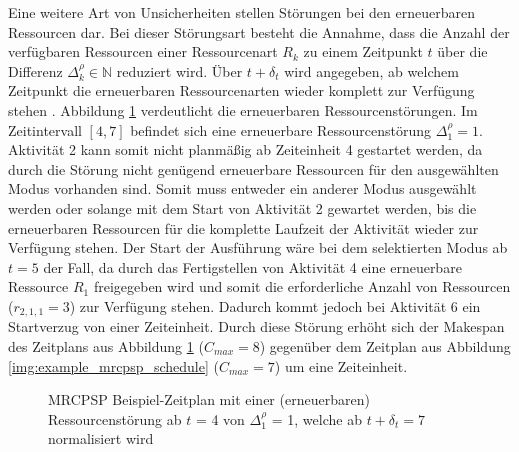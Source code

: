 Eine weitere Art von Unsicherheiten stellen Störungen bei den erneuerbaren Ressourcen dar. Bei dieser Störungsart besteht die Annahme, dass die Anzahl der verfügbaren Ressourcen einer Ressourcenart $R_k$ zu einem Zeitpunkt $t$ über die Differenz $\Delta^\rho_k \in \mathbb{N}$ reduziert wird. Über $t + \delta_t$ wird angegeben, ab welchem Zeitpunkt die erneuerbaren Ressourcenarten wieder komplett zur Verfügung stehen \cite[vgl.][S. 65 f.]{deblaere_reactive_2011}. Abbildung \ref{img:example_mrcpsp_schedule_resourcedisturbance} verdeutlicht die erneuerbaren Ressourcenstörungen. Im Zeitintervall $[4, 7]$ befindet sich eine erneuerbare Ressourcenstörung $\Delta^\rho_1 = 1$. Aktivität 2 kann somit nicht planmäßig ab Zeiteinheit 4 gestartet werden, da durch die Störung nicht genügend erneuerbare Ressourcen für den ausgewählten Modus vorhanden sind. Somit muss entweder ein anderer Modus ausgewählt werden oder solange mit dem Start von Aktivität 2 gewartet werden, bis die erneuerbaren Ressourcen für die komplette Laufzeit der Aktivität wieder zur Verfügung stehen. Der Start der Ausführung wäre bei dem selektierten Modus ab $t = 5$ der Fall, da durch das Fertigstellen von Aktivität 4 eine erneuerbare Ressource $R_1$ freigegeben wird und somit die erforderliche Anzahl von Ressourcen ($r_{2,1,1} = 3$) zur Verfügung stehen. Dadurch kommt jedoch bei Aktivität 6 ein Startverzug von einer Zeiteinheit. Durch diese Störung erhöht sich der Makespan des Zeitplans aus Abbildung \ref{img:example_mrcpsp_schedule_resourcedisturbance} ($C_{max} = 8$) gegenüber dem Zeitplan aus Abbildung \ref{img:example_mrcpsp_schedule} ($C_{max} = 7$) um eine Zeiteinheit.

\begin{figure}[H]
    \centering
    \noindent{}
    \caption{MRCPSP Beispiel-Zeitplan mit einer (erneuerbaren) Ressourcenstörung ab $t$ = 4 von $\Delta_1^\rho$ = 1, welche ab $t + \delta_t = 7$ normalisiert wird} 
    \label{img:example_mrcpsp_schedule_resourcedisturbance}
\end{figure}

